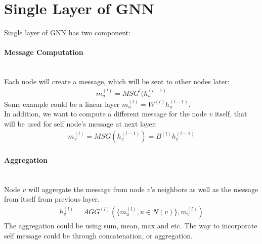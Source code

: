\section{Single Layer of GNN}
Single layer of GNN has two component: 
\paragraph{Message Computation} \mbox{}\\
Each node will create a message, which will be sent to other nodes later: 
    \begin{align*}
        m_u^{(l)} = MSG^{{l}}(h_u^{(l-1)}
    \end{align*}
Some example could be a linear layer  $m_u^{(l)} = W^{(l)}h_u^{(l-1)}$. \\
In addition, we want to compute a different message for the node $v$ itself, that will be used for self node's message at next layer: 
    \begin{align*}
        m_v^{(l)} = MSG(h_v^{(l-1)}) = B^{(l)}h_v^{(l-1)} \tag{example of linear embedding}
    \end{align*}

\paragraph{Aggregation} \mbox{}\\
Node $v$ will aggregate the message from node $v$'s neighbors as well as the message from itself from previous layer. 
    \begin{align*}
        h_v^{(l)} = AGG^{(l)}(\{m_u^{(l)}, u\in N(v) \}, m_v^{(l)})
    \end{align*}
The aggregation could be using sum, mean, max and etc. The way to incorporate self message could be through concatenation, or aggregation. 


